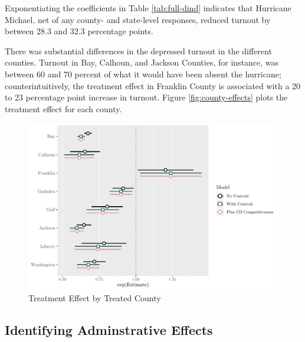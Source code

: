 \documentclass[
  12pt,
]{article}
\begin{document}
\begin{singlespace}


\end{singlespace}

Exponentiating the coefficients in Table \ref{tab:full-dind} indicates that Hurricane Michael, net of any county- and state-level responses, reduced turnout by between 28.3 and 32.3 percentage points.

There was substantial differences in the depressed turnout in the different counties. Turnout in Bay, Calhoun, and Jackson Counties, for instance, was between 60 and 70 percent of what it would have been absent the hurricane; counterintuitively, the treatment effect in Franklin County is associated with a 20 to 23 percentage point increase in turnout. Figure \ref{fig:county-effects} plots the treatment effect for each county.

\begin{figure}[H]

{\centering \includegraphics{hurricane_michael_files/figure-latex/county-effect-chunk-1} 

}

\caption{\label{fig:county-effects}Treatment Effect by Treated County}\label{fig:county-effect-chunk}
\end{figure}

\hypertarget{identifying-adminstrative-effects}{%
\subsection*{Identifying Adminstrative Effects}\label{identifying-adminstrative-effects}}
\end{document}
